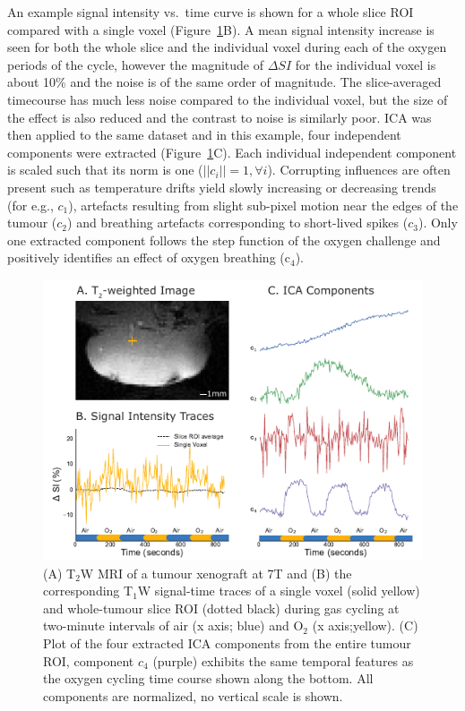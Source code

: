 An example signal intensity vs.\ time curve is shown for a whole slice ROI compared with a single voxel (Figure~\ref{technique}B).
A mean signal intensity increase is seen for both the whole slice and the individual voxel during each of the oxygen periods of the cycle, however the magnitude of $\Delta SI$ for the individual voxel is about 10\% and the noise is of the same order of magnitude.
The slice-averaged timecourse has much less noise compared to the individual voxel, but the size of the effect is also reduced and the contrast to noise is similarly poor.
ICA was then applied to the same dataset and in this example, four independent components were extracted (Figure~\ref{technique}C). 
Each individual independent component is scaled such that its norm is one ($||c_i||=1, \forall i $).
Corrupting influences are often present such as temperature drifts yield slowly increasing or decreasing trends (for e.g., $c_1$), artefacts resulting from slight sub-pixel motion near the edges of the tumour ($c_2$) and breathing artefacts corresponding to short-lived spikes ($c_3$).
Only one extracted component follows the step function of the oxygen challenge and positively identifies an effect of oxygen breathing (c$_4$).
\begin{figure}[htbp]
   \includegraphics[width=\textwidth]{oemri_thesis1/oemri_thesis1-images/fig1_technique.pdf} %
   \caption{(A) T$_2$W MRI of a tumour xenograft at 7T and (B) the corresponding T$_1$W signal-time traces of a single voxel (solid yellow) and whole-tumour slice ROI (dotted black) during gas cycling at two-minute intervals of air (x axis; blue) and O$_2$ (x axis;yellow).
(C) Plot of the four extracted ICA components from the entire tumour ROI, component \textbf{$c_4$} (purple) exhibits the same temporal features as the oxygen cycling time course shown along the bottom. All components are normalized, no vertical scale is shown.}
   \label{technique}
\end{figure}

